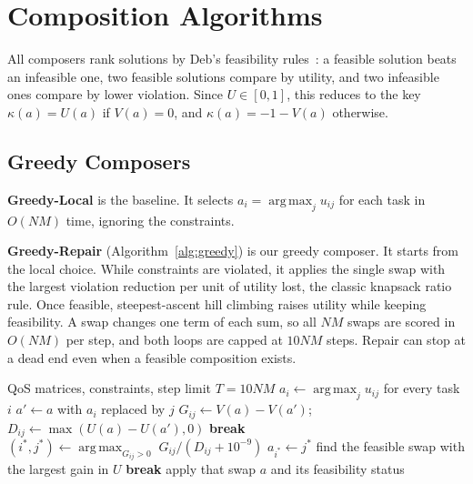 \documentclass[conference]{IEEEtran}
\DeclareMathOperator*{\argmax}{arg\,max}
\begin{document}
\section{Composition Algorithms}\label{sec:algorithms}
All composers rank solutions by Deb's feasibility rules~\cite{deb2000}: a feasible solution beats an infeasible one, two feasible solutions compare by utility, and two infeasible ones compare by lower violation. Since $U\in[0,1]$, this reduces to the key $\kappa(a)=U(a)$ if $V(a)=0$, and $\kappa(a)=-1-V(a)$ otherwise.

\subsection{Greedy Composers}
\textbf{Greedy-Local} is the baseline. It selects $a_i=\argmax_j u_{ij}$ for each task in $O(NM)$ time, ignoring the constraints.

\textbf{Greedy-Repair} (Algorithm~\ref{alg:greedy}) is our greedy composer. It starts from the local choice. While constraints are violated, it applies the single swap with the largest violation reduction per unit of utility lost, the classic knapsack ratio rule. Once feasible, steepest-ascent hill climbing raises utility while keeping feasibility. A swap changes one term of each sum, so all $NM$ swaps are scored in $O(NM)$ per step, and both loops are capped at $10NM$ steps. Repair can stop at a dead end even when a feasible composition exists.

\begin{algorithm}[t]
\caption{Greedy-Repair}\label{alg:greedy}
\footnotesize
\begin{algorithmic}[1]
\Require QoS matrices, constraints, step limit $T=10NM$
\State $a_i \gets \argmax_j u_{ij}$ for every task $i$
 
    \State $a' \gets a$ with $a_i$ replaced by $j$
    \State $G_{ij}\gets V(a)-V(a')$;\; $D_{ij}\gets \max(U(a)-U(a'),0)$
  \EndFor
   \textbf{break} 
  \EndIf
  \State $(i^{*},j^{*})\gets \argmax_{G_{ij}>0}\; G_{ij}/(D_{ij}+10^{-9})$
  \State $a_{i^{*}} \gets j^{*}$
\EndWhile
{} 
    \State find the feasible swap with the largest gain in $U$
     \textbf{break}
    \EndIf
    \State apply that swap
  \EndWhile
\EndIf
\State \Return $a$ and its feasibility status
\end{algorithmic}
\end{algorithm}
\end{document}
